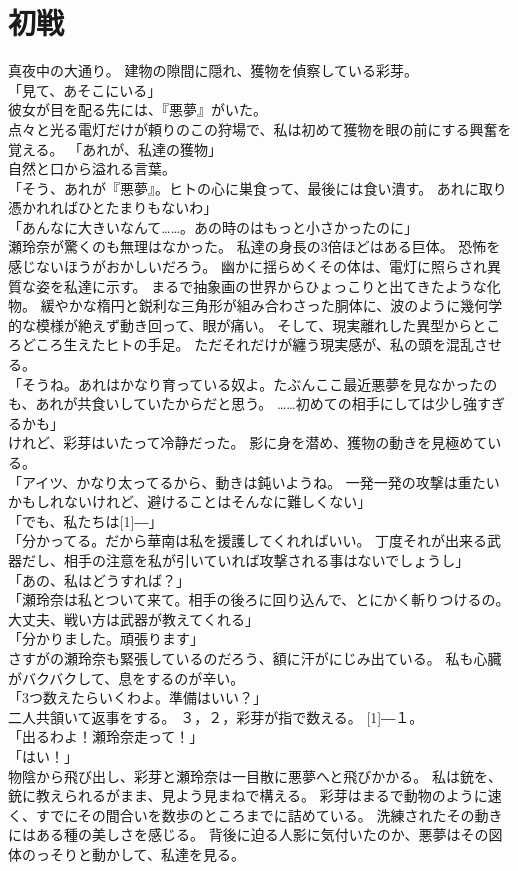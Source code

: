 \documentclass[autodetect-engine,dvipdfmx-if-dvi,a5paper,ja=standard,twoside,titlepage,final,twocolumn]{ltjtbook}
\begin{document}
\section{初戦}
真夜中の大通り。
建物の隙間に隠れ、獲物を偵察している彩芽。\\
「見て、あそこにいる」\\
彼女が目を配る先には、『悪夢』がいた。\\
点々と光る電灯だけが頼りのこの狩場で、私は初めて獲物を眼の前にする興奮を覚える。
「あれが、私達の獲物」\\
自然と口から溢れる言葉。\\
「そう、あれが『悪夢』。ヒトの心に巣食って、最後には食い潰す。
あれに取り憑かれればひとたまりもないわ」\\
「あんなに大きいなんて……。あの時のはもっと小さかったのに」\\
瀬玲奈が驚くのも無理はなかった。
私達の身長の3倍ほどはある巨体。
恐怖を感じないほうがおかしいだろう。
幽かに揺らめくその体は、電灯に照らされ異質な姿を私達に示す。
まるで抽象画の世界からひょっこりと出てきたような化物。
緩やかな楕円と鋭利な三角形が組み合わさった胴体に、波のように幾何学的な模様が絶えず動き回って、眼が痛い。
そして、現実離れした異型からところどころ生えたヒトの手足。
ただそれだけが纏う現実感が、私の頭を混乱させる。\\
「そうね。あれはかなり育っている奴よ。たぶんここ最近悪夢を見なかったのも、あれが共食いしていたからだと思う。
……初めての相手にしては少し強すぎるかも」\\
けれど、彩芽はいたって冷静だった。
影に身を潜め、獲物の動きを見極めている。\\
「アイツ、かなり太ってるから、動きは鈍いようね。
一発一発の攻撃は重たいかもしれないけれど、避けることはそんなに難しくない」\\
「でも、私たちは\scalebox{3}[1]{―}」\\
「分かってる。だから華南は私を援護してくれればいい。
丁度それが出来る武器だし、相手の注意を私が引いていれば攻撃される事はないでしょうし」\\
「あの、私はどうすれば？」\\
「瀬玲奈は私とついて来て。相手の後ろに回り込んで、とにかく斬りつけるの。大丈夫、戦い方は武器が教えてくれる」\\
「分かりました。頑張ります」\\
さすがの瀬玲奈も緊張しているのだろう、額に汗がにじみ出ている。
私も心臓がバクバクして、息をするのが辛い。\\
「3つ数えたらいくわよ。準備はいい？」\\
二人共頷いて返事をする。
３，２，彩芽が指で数える。
\scalebox{3}[1]{―}１。\\
「出るわよ！瀬玲奈走って！」\\
「はい！」\\
物陰から飛び出し、彩芽と瀬玲奈は一目散に悪夢へと飛びかかる。
私は銃を、銃に教えられるがまま、見よう見まねで構える。
彩芽はまるで動物のように速く、すでにその間合いを数歩のところまでに詰めている。
洗練されたその動きにはある種の美しさを感じる。
背後に迫る人影に気付いたのか、悪夢はその図体のっそりと動かして、私達を見る。
\end{document}
